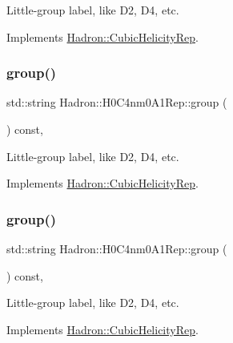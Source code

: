 Little-\/group label, like D2, D4, etc. 

Implements \mbox{\hyperlink{structHadron_1_1CubicHelicityRep_a101a7d76cd8ccdad0f272db44b766113}{Hadron\+::\+Cubic\+Helicity\+Rep}}.

\mbox{\label{structHadron_1_1H0C4nm0A1Rep_a721e8c07bbc6143cad2cf745771be3f9}} 
\subsubsection{\texorpdfstring{group()}{group()}\hspace{0.1cm}{\footnotesize\ttfamily [3/5]}}
{\footnotesize\ttfamily std\+::string Hadron\+::\+H0\+C4nm0\+A1\+Rep\+::group (\begin{DoxyParamCaption}{ }\end{DoxyParamCaption}) const\hspace{0.3cm}{\ttfamily [inline]}, {\ttfamily [virtual]}}

Little-\/group label, like D2, D4, etc. 

Implements \mbox{\hyperlink{structHadron_1_1CubicHelicityRep_a101a7d76cd8ccdad0f272db44b766113}{Hadron\+::\+Cubic\+Helicity\+Rep}}.

\mbox{\label{structHadron_1_1H0C4nm0A1Rep_a721e8c07bbc6143cad2cf745771be3f9}} 
\subsubsection{\texorpdfstring{group()}{group()}\hspace{0.1cm}{\footnotesize\ttfamily [4/5]}}
{\footnotesize\ttfamily std\+::string Hadron\+::\+H0\+C4nm0\+A1\+Rep\+::group (\begin{DoxyParamCaption}{ }\end{DoxyParamCaption}) const\hspace{0.3cm}{\ttfamily [inline]}, {\ttfamily [virtual]}}

Little-\/group label, like D2, D4, etc. 

Implements \mbox{\hyperlink{structHadron_1_1CubicHelicityRep_a101a7d76cd8ccdad0f272db44b766113}{Hadron\+::\+Cubic\+Helicity\+Rep}}.


